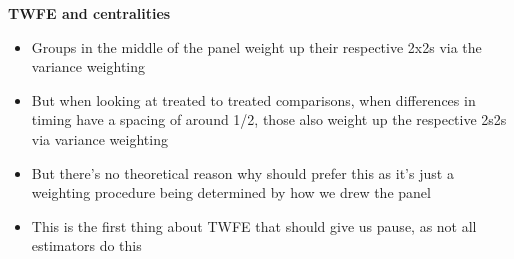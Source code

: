 \documentclass[notes=show]{beamer}
\begin{document}
\begin{frame}[plain]
\begin{center}
\textbf{TWFE and centralities}
\end{center}

\begin{itemize}
\item Groups in the middle of the panel weight up their respective 2x2s via the variance weighting
\item But when looking at treated to treated comparisons, when differences in timing have a spacing of around 1/2, those also weight up the respective 2s2s via variance weighting
\item But there's no theoretical reason why should prefer this as it's just a weighting procedure being determined by how we drew the panel
\item This is the first thing about TWFE that should give us pause, as not all estimators do this
\end{itemize}

\end{frame}



\end{document}
